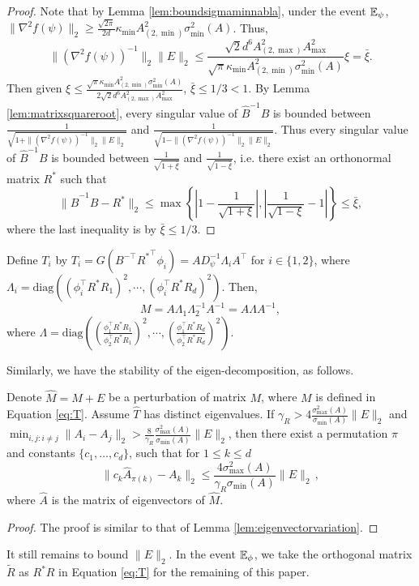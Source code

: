 \begin{proof}
Note that by Lemma \ref{lem:boundsigmaminnabla},  under the event $\mathbb{E}_{\psi}$, $\|\nabla^2f(\psi)\|_2 \ge \frac{\sqrt{2\pi}}{2d}\kappa_{\min}A^2_{(2,\min)}\sigma_{\min}^2(A)$. Thus,
\[
\|\left(\nabla^2f(\psi)\right)^{-1}\|_2 \|E\|_2 \le \frac{\sqrt{2}d^6A_{(2,\max)}^2A_{\max}^2}{\sqrt{\pi}\kappa_{\min}A^2_{(2,\min)}\sigma_{\min}^2(A)}\xi = \bar{\xi}.
\]
Then given $\xi \le \frac{\sqrt{\pi}\kappa_{\min}A^2_{(2,\min)}\sigma_{\min}^2(A)}{2\sqrt{2}d^6A_{(2,\max)}^2A_{\max}^2}$, $\bar{\xi} \le 1/3 < 1$. 
By Lemma \ref{lem:matrixsquareroot}, every singular value of $\widehat{B}^{-1}B$ is bounded between $\frac{1}{\sqrt{1 + \|\left(\nabla^2f(\psi)\right)^{-1}\|_2 \|E\|_2}}$ and $\frac{1}{\sqrt{1 - \|\left(\nabla^2f(\psi)\right)^{-1}\|_2 \|E\|_2}}$. 
Thus every singular value of $\widehat{B}^{-1}B$ is bounded between $\frac{1}{\sqrt{1+\bar{\xi}}}$ and $\frac{1}{\sqrt{1-\bar{\xi}}}$, i.e. there exist an orthonormal matrix $R^*$ such that 
\[
\|\widehat{B}^{-1}B - R^*\|_2 \le \max \left\{ \left|1-\frac{1}{\sqrt{1+\xi}}\right| , \left|\frac{1}{\sqrt{1-\xi}}-1\right| \right\} \le \bar{\xi},
\]
where the last inequality is by $\bar{\xi} \le 1/3$.
\end{proof}

Define $T_i$ by $T_i = G(B^{-\top}{R^*}^{\top}\phi_i) = A D_{\psi}^{-1}\Lambda_iA^{\top}$ for $i \in \{1,2\}$,
where $\Lambda_i = \text{diag}\left((\phi_i^{\top}R^*R_1)^2, \cdots, (\phi_i^{\top}R^*R_d)^2\right)$. 
Then, 
\begin{equation}
\label{eq:T}
M = A \Lambda_1 \Lambda_2^{-1} A^{-1} = A \Lambda A^{-1},
\end{equation}
where $\Lambda = \text{diag}\left((\frac{\phi_1^{\top}R^*R_1}{\phi_2^{\top}R^*R_1})^2, \cdots, (\frac{\phi_1^{\top}R^*R_d}{\phi_2^{\top}R^*R_d})^2\right)$. 

Similarly, we have the stability of the eigen-decomposition, as follows. 
\begin{lemma}
\label{lem:Teigenvectorvariation}
Denote $\widehat{M} = M+E$ be a perturbation of matrix $M$, where $M$ is defined in Equation \eqref{eq:T}. 
Assume $\widehat{T}$ has distinct eigenvalues. 
If $\gamma_R > 4 \frac{\sigma_{\max}^2(A)}{\sigma_{\min}(A) }\|E\|_2$ and $\min_{i,j:i\neq j} \|A_i - A_j\|_2 > \frac{8}{\gamma_R}\frac{\sigma_{\max}^2(A)}{\sigma_{\min}(A) } \|E\|_2$, then there exist a permutation $\pi$ and constants $\{c_1,\ldots,c_d\}$, such that for $1\le k\le d$
\[
\| c_k\widehat{A}_{\pi(k)} - A_k\|_2 \le \frac{4\sigma^2_{\max}(A)}{\gamma_R\sigma_{\min}(A)} \|E\|_2\,,
\]
where $\widehat{A}$ is the matrix of eigenvectors of $\widehat{M}$. 
\end{lemma}
\begin{proof}
The proof is similar to that of Lemma \ref{lem:eigenvectorvariation}.
\end{proof}
It still remains to bound $\|E\|_2$. In the event $\mathbb{E}_{\phi}$, we take the orthogonal matrix $\tilde{R}$ as $R^*R$ in Equation \ref{eq:T} for the remaining of this paper.

